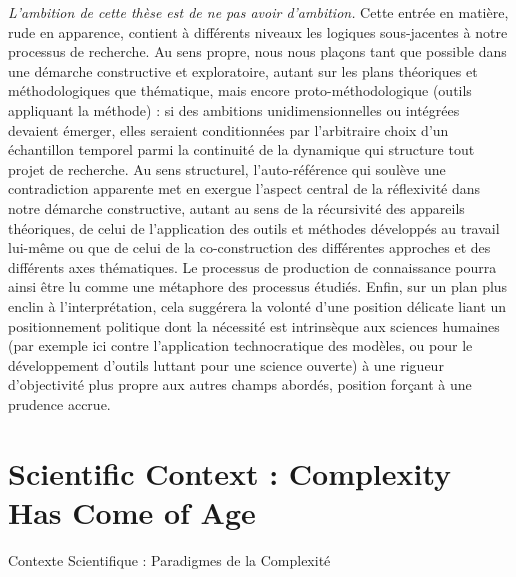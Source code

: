 {
\emph{L'ambition de cette thèse est de ne pas avoir d'ambition.} Cette entrée en matière, rude en apparence, contient à différents niveaux les logiques sous-jacentes à notre processus de recherche. Au sens propre, nous nous plaçons tant que possible dans une démarche constructive et exploratoire, autant sur les plans théoriques et méthodologiques que thématique, mais encore proto-méthodologique (outils appliquant la méthode) : si des ambitions unidimensionnelles ou intégrées devaient émerger, elles seraient conditionnées par l'arbitraire choix d'un échantillon temporel parmi la continuité de la dynamique qui structure tout projet de recherche. Au sens structurel, l'auto-référence qui soulève une contradiction apparente met en exergue l'aspect central de la réflexivité dans notre démarche constructive, autant au sens de la récursivité des appareils théoriques, de celui de l'application des outils et méthodes développés au travail lui-même ou que de celui de la co-construction des différentes approches et des différents axes thématiques. Le processus de production de connaissance pourra ainsi être lu comme une métaphore des processus étudiés. Enfin, sur un plan plus enclin à l'interprétation, cela suggérera la volonté d'une position délicate liant un positionnement politique dont la nécessité est intrinsèque aux sciences humaines (par exemple ici contre l'application technocratique des modèles, ou pour le développement d'outils luttant pour une science ouverte) à une rigueur d'objectivité plus propre aux autres champs abordés, position forçant à une prudence accrue.
}




\section*{Scientific Context : Complexity Has Come of Age}{Contexte Scientifique : Paradigmes de la Complexité}



